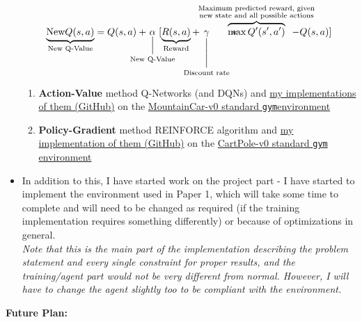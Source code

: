 \documentclass[
]{article}
\begin{document}
\begin{itemize}
  \[\underbrace{\text{New}Q(s,a)}_{\scriptstyle\text{New Q-Value}}=Q(s,a)+\mkern-34mu\underset{\text{New Q-Value}}{\underset{\Bigl|}{\alpha}}\mkern-30mu[\underbrace{R(s,a)}_{\scriptstyle\text{Reward}}+\mkern-30mu\underset{\text{Discount rate}}{\underset{\Biggl|}{\gamma}}*\mkern-75mu\overbrace{\max Q'(s',a')}^{\scriptstyle\substack{\text{Maximum predicted reward, given} \\ \text{new state and all possible actions}}}\mkern-45mu-Q(s,a)]\]

  \begin{enumerate}
  \def\labelenumi{\arabic{enumi}.}
  \item
    \textbf{Action-Value} method Q-Networks (and DQNs) and
    \href{https://github.com/Plutonium-239/deeprl-in-sgbd}{my
    implementations of them (GitHub)} on the
    \href{https://gym.openai.com/envs/MountainCar-v0/}{MountainCar-v0
    standard \texttt{gym}environment}
  \item
    \textbf{Policy-Gradient} method REINFORCE algorithm and
    \href{https://github.com/Plutonium-239/deeprl-in-sgbd}{my
    implementation of them (GitHub)} on the
    \href{https://gym.openai.com/envs/CartPole-v1/}{CartPole-v0 standard
    \texttt{gym} environment }
  \end{enumerate}
\item
  In addition to this, I have started work on the project part - I have
  started to implement the environment used in Paper 1, which will take
  some time to complete and will need to be changed as required (if the
  training implementation requires something differently) or because of
  optimizations in general. \\
  \emph{Note that this is the main part of the implementation describing
  the problem statement and every single constraint for proper results,
  and the training/agent part would not be very different from normal.
  However, I will have to change the agent slightly too to be compliant
  with the environment.}
\end{itemize}

\textbf{Future Plan:}
\end{document}

